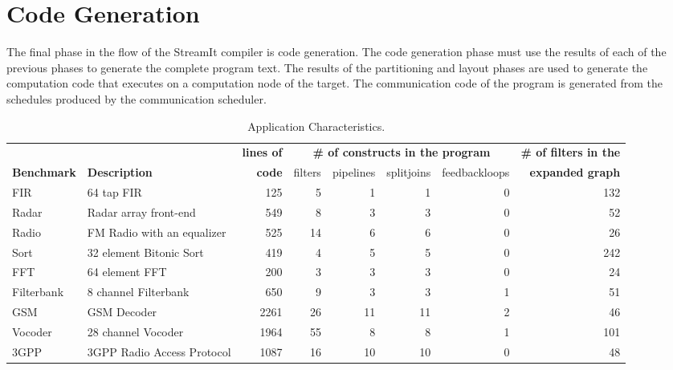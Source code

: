 \section{Code Generation}
\label{sec:codegen}

The final phase in the flow of the StreamIt compiler is code
generation.  The code generation phase must use the results of each of
the previous phases to generate the complete program text.  The
results of the partitioning and layout phases are used to generate the
computation code that executes on a computation node of the target.
The communication code of the program is generated from the schedules
produced by the communication scheduler.

\begin{table*}[t]
\begin{center}
\scriptsize
\begin{tabular}{|l|l||r||r|r|r|r||r||} \hline
 & & {\bf lines of} & \multicolumn{4}{|c||}{\bf \# of constructs in the program} & {\bf \# of filters in the} \\ \cline{4-7}
{\bf Benchmark} & {\bf Description} & {\bf code} & filters & pipelines & splitjoins & feedbackloops & {\bf expanded graph}
\\
\hline \hline
FIR & 64 tap FIR & 
125 & 5 & 1 & 1 & 0 & 132
\\ \hline
Radar & Radar array front-end\cite{pca} & 
549 & 8 & 3 & 3 & 0 & 52
\\ \hline
Radio & FM Radio with an equalizer & 
525 & 14 & 6 & 6 & 0 & 26
\\ \hline
Sort & 32 element Bitonic Sort & 
419 & 4 & 5 & 5 & 0 & 242
\\  \hline
FFT & 64 element FFT & 
200 & 3 & 3 & 3 & 0 & 24
\\  \hline
Filterbank & 8 channel Filterbank & 
650 & 9 & 3 & 3 & 1 & 51
\\  \hline
GSM & GSM Decoder & 
2261 & 26 & 11 & 11 & 2 & 46
\\ \hline
Vocoder & 28 channel Vocoder &  
1964 & 55 & 8 & 8 & 1 & 101
\\ \hline
3GPP & 3GPP Radio Access Protocol &  
1087 & 16 & 10 & 10 & 0 & 48
\\ \hline
\hline
\end{tabular}
\vspace{-6pt}
\caption{\protect\small Application Characteristics.}
\label{tab:benchmarks}
\vspace{-12pt}
\end{center}
\end{table*}

